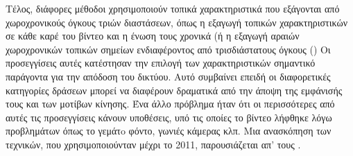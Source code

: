 Τέλος, διάφορες μέθοδοι χρησιμοποιούν τοπικά χαρακτηριστικά που εξάγονται από χωροχρονικούς όγκους τριών διαστάσεων,
όπως η εξαγωγή τοπικών χαρακτηριστικών σε κάθε καρέ του βίντεο και η ένωση τους χρονικά (\en\cite{784616, 990935, 1544882}\gr ή 
η εξαγωγή αραιών χωροχρονικών τοπικών σημείων ενδιαφέροντος από τρισδιάστατους όγκους (\en\cite{1238378, 1570899,  Niebles, 1467373, Ryoo2006}\gr)
Οι προσεγγίσεις αυτές κατέστησαν την επιλογή των χαρακτηριστικών  σημαντικό παράγοντα για την απόδοση του δικτύου.
Αυτό συμβαίνει επειδή οι διαφορετικές κατηγορίες δράσεων μπορεί να διαφέρουν δραματικά από την άποψη της εμφάνισής τους και των μοτίβων κίνησης.
Ένα άλλο πρόβλημα ήταν ότι οι περισσότερες από αυτές τις προσεγγίσεις κάνουν υποθέσεις, υπό τις οποίες το βίντεο λήφθηκε λόγω προβλημάτων όπως το γεμάτo
φόντο,  γωνιές κάμερας κλπ. Μια ανασκόπηση των τεχνικών, που χρησιμοποιούνταν  μέχρι το 2011, παρουσιάζεται απ' τους \en\cite{Aggarwal:2011:HAA:1922649.1922653}\gr.  \par

